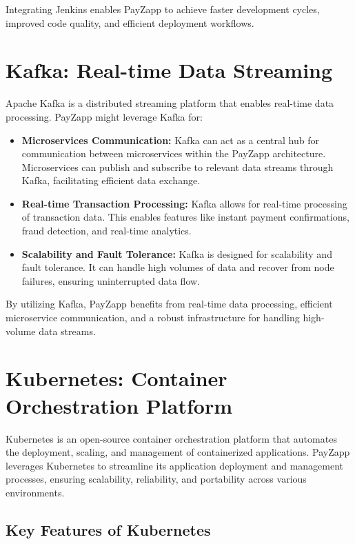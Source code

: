 \documentclass[12pt,a4paper]{report}
\begin{document}
Integrating Jenkins enables PayZapp to achieve faster development cycles, improved code quality, and efficient deployment workflows.

\section{Kafka: Real-time Data Streaming}

Apache Kafka is a distributed streaming platform that enables real-time data processing. PayZapp might leverage Kafka for:

\begin{itemize}
    \item \textbf{Microservices Communication:} Kafka can act as a central hub for communication between microservices within the PayZapp architecture. Microservices can publish and subscribe to relevant data streams through Kafka, facilitating efficient data exchange.
    
    \item \textbf{Real-time Transaction Processing:} Kafka allows for real-time processing of transaction data. This enables features like instant payment confirmations, fraud detection, and real-time analytics.
    
    \item \textbf{Scalability and Fault Tolerance:} Kafka is designed for scalability and fault tolerance. It can handle high volumes of data and recover from node failures, ensuring uninterrupted data flow.
\end{itemize}

By utilizing Kafka, PayZapp benefits from real-time data processing, efficient microservice communication, and a robust infrastructure for handling high-volume data streams.

\section{Kubernetes: Container Orchestration Platform}

Kubernetes is an open-source container orchestration platform that automates the deployment, scaling, and management of containerized applications. PayZapp leverages Kubernetes to streamline its application deployment and management processes, ensuring scalability, reliability, and portability across various environments.

\subsection{Key Features of Kubernetes}
\end{document}
